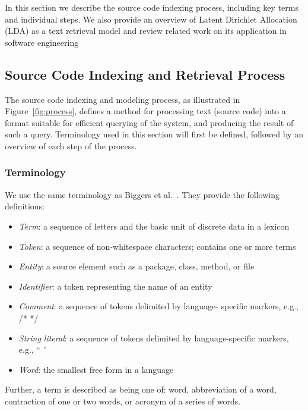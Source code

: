 
%
In this section we describe the source code indexing process,
including key terms and individual steps.
We also provide an overview of Latent Dirichlet Allocation (LDA) as a text retrieval model
and review related work on its application in software engineering

\subsection{Source Code Indexing and Retrieval Process}

The source code indexing and modeling process,
as illustrated in Figure~\ref{fig:process},
defines a method for processing text (source code) into
a format suitable for efficient querying of the system, and
producing the result of such a query.
Terminology used in this section will first be defined, followed by an overview of each step of the process.

    \subsubsection{Terminology}
    We use the same terminology as Biggers et al.~\cite{Biggers-etal:2014}.
    They provide the following definitions:
    \begin{itemize}
    \item \textit{Term}: a sequence of letters and the basic unit of discrete data in a lexicon
    \item \textit{Token}: a sequence of non-whitespace characters; contains one or more terms
    \item \textit{Entity}: a source element such as a package, class, method, or file
    \item \textit{Identifier}: a token representing the name of an entity
    \item \textit{Comment}: a sequence of tokens delimited by language-
    specific markers, e.g., /* */
    \item \textit{String literal}: a sequence of tokens delimited by
    language-specific markers, e.g., “ ”
    \item \textit{Word}: the smallest free form in a language
    \end{itemize}
    Further, a term is described as being one of:
    word,
    abbreviation of a word,
    contraction of one or two words,
    or acronym of a series of words.

